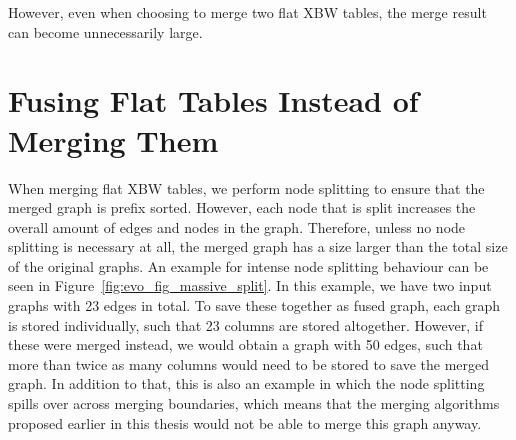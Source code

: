 \documentclass[a4paper,12pt,twoside,BCOR=10mm]{scrbook}
\begin{document}
However, even when choosing to merge two flat XBW tables,
the merge result can become unnecessarily large.


\section{Fusing Flat Tables Instead of Merging Them}
%

When merging flat XBW tables, we perform node splitting to ensure that the
merged graph is prefix sorted.
However, each node that is split increases the overall amount of edges
and nodes in the graph.
Therefore, unless no node splitting is necessary at all,
the merged graph has a size larger than the total size of the
original graphs. An example for intense node splitting behaviour can
be seen in Figure~\ref{fig:evo_fig_massive_split}.
In this example, we have two input graphs with 23 edges in total.
To save these together as fused graph, each graph is stored individually,
such that 23 columns are stored altogether.
However, if these were merged instead, we would obtain a graph with 50 edges,
such that more than twice as many columns would need to be stored to save the
merged graph.
In addition to that, this is also an example in which the node splitting spills over
across merging boundaries, which means that the merging algorithms proposed earlier
in this thesis would not be able to merge this graph anyway.
\end{document}
